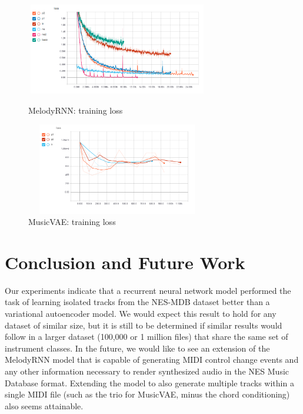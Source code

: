 \documentclass{article}
\begin{document}
\begin{figure}[htb!]
  \begin{minipage}{0.48\textwidth}
    \centering
    \includegraphics[height=4cm, width=8cm]{img/rnn_loss_all.png}
    \caption{MelodyRNN: training loss}
  \end{minipage}\hfill
  \begin{minipage}{0.48\textwidth}
    \centering
    \includegraphics[height=4cm, width=8cm]{img/vae_loss.png}
    \caption{MusicVAE: training loss}
  \end{minipage}
\end{figure}



\section{Conclusion and Future Work}

Our experiments indicate that a recurrent neural network model performed the task of learning isolated tracks from the NES-MDB dataset better than a variational autoencoder model. We would expect this result to hold for any dataset of similar size, but it is still to be determined if similar results would follow in a larger dataset (100,000 or 1 million files) that share the same set of instrument classes. In the future, we would like to see an extension of the MelodyRNN model that is capable of generating MIDI control change events and any other information necessary to render synthesized audio in the NES Music Database format. Extending the model to also generate multiple tracks within a single MIDI file (such as the trio for MusicVAE, minus the chord conditioning) also seems attainable.
\end{document}
